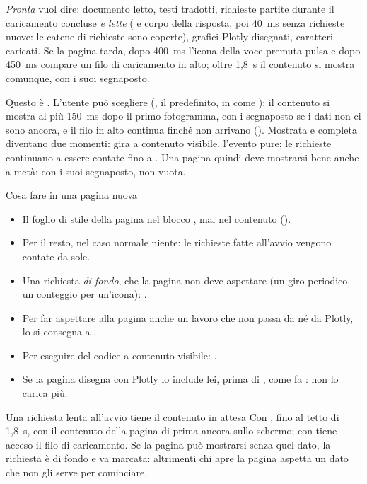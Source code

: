 \emph{Pronta} vuol dire: documento letto, testi tradotti, richieste partite
durante il caricamento concluse \emph{e lette} ( e corpo della
risposta, poi 40~ms senza richieste nuove: le catene di richieste sono
coperte), grafici Plotly disegnati, caratteri caricati. Se la pagina tarda,
dopo 400~ms l'icona della voce premuta pulsa e dopo 450~ms compare un filo
di caricamento in alto; oltre 1,8~s il contenuto si mostra comunque, con i
suoi segnaposto.

Questo è . L'utente può scegliere 
(, il predefinito, in
 come ): il contenuto si mostra al più
150~ms dopo il primo fotogramma, con i segnaposto se i dati non ci sono
ancora, e il filo in alto continua finché non arrivano ().
Mostrata e completa diventano due momenti: 
gira a contenuto visibile, l'evento  pure; le
richieste continuano a essere contate fino a . Una pagina
quindi deve mostrarsi bene anche a metà: con i suoi segnaposto, non vuota.

\begin{pratica}{Cosa fare in una pagina nuova}
\begin{itemize}
  \item Il foglio di stile della pagina nel blocco , mai nel
        contenuto ().
  \item Per il resto, nel caso normale niente: le richieste fatte all'avvio
        vengono contate da sole.
  \item Una richiesta \emph{di fondo}, che la pagina non deve aspettare (un
        giro periodico, un conteggio per un'icona):
        .
  \item Per far aspettare alla pagina anche un lavoro che non passa da
         né da Plotly, lo si consegna a
        .
  \item Per eseguire del codice a contenuto visibile:
        .
  \item Se la pagina disegna con Plotly lo include lei, prima di
        , come fa :  non lo
        carica più.
\end{itemize}
\end{pratica}

\begin{attenzione}{Una richiesta lenta all'avvio tiene il contenuto in attesa}
Con , fino al tetto di 1,8~s, con il contenuto della pagina
di prima ancora sullo schermo; con  tiene acceso il filo di
caricamento. Se la pagina può mostrarsi senza quel dato, la richiesta è di fondo
e va marcata: altrimenti chi apre la pagina aspetta un dato che non gli
serve per cominciare.
\end{attenzione}

